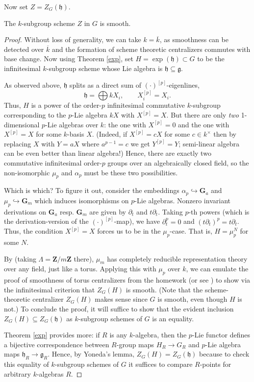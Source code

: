 \documentclass[10pt]{article}
\renewcommand{\(}{\left(}
\renewcommand{\)}{\right)}
\numberwithin{thm}{subsection}
\begin{document}
Now set $Z= Z_G(\mathfrak{h})$.
\begin{lemma}\label{smoothz}
The $k$-subgroup scheme $Z$ in $G$ is smooth.
\end{lemma}
\begin{proof}
Without loss of generality, we can take $k=\overline{k}$,
as smoothness can be detected over $\overline{k}$ and the formation
of scheme theoretic centralizers commutes with base change.
Now using Theorem \ref{exp}, set $H=\exp(\mathfrak{h})\subset G$ to be
the infinitesimal $k$-subgroup scheme whose Lie algebra is $\mathfrak{h} \subseteq \mathfrak{g}$.

As observed above, $\mathfrak{h}$ splits as a direct sum of $(\cdot)^{[p]}$-eigenlines,
\[\mathfrak{h}=\bigoplus kX_i,\qquad X_i^{[p]}= X_i.\]
Thus, $H$ is a power of the order-$p$ infinitesimal commutative $k$-subgroup
 corresponding to the $p$-Lie algebra $kX$ with 
$X^{[p]}=X$.  But there are only {\em two} 1-dimensional
$p$-Lie algebras over $k$: the one with $X^{[p]} = 0$ and
the one with $X^{[p]} = X$ for some $k$-basis $X$.
(Indeed, if $X^{[p]} = c X$ for some $c \in k^{\times}$ then 
by replacing $X$ with $Y = aX$ where $a^{p-1} = c$ we get $Y^{[p]} = Y$;
semi-linear algebra can be even better than linear algebra!)
Hence, there are exactly two commutative infinitesimal order-$p$ groups over an algebraically closed field,
so the non-isomorphic $\mu_p$ and $\alpha_p$ must be these two possibilities. 

Which is which? To figure it out, 
consider the embeddings
$\alpha_p\hookrightarrow\mathbf{G}_a$ and 
$\mu_p\hookrightarrow\mathbf{G}_m$ which induces isomorphisms on $p$-Lie algebras.
Nonzero invariant derivations 
on $\mathbf{G}_a$ resp. $\mathbf{G}_m$ are given by 
$\partial_t$ and $t \partial_t$.
Taking $p$-th powers
(which is the derivation-version of the $(\cdot)^{[p]}$-map),
we have 
$\partial_t^p = 0$ and 
$(t \partial_t)^p = t \partial_t$. 
Thus, the condition $X^{[p]}=X$ forces us to be
in the $\mu_p$-case.  That is, $H=\mu_p^N$ for some $N$.

By \cite[Lemma A.8.8]{pred} (taking $\Lambda = {\mathbf{Z}}/m{\mathbf{Z}}$ there), $\mu_m$ has completely reducible representation theory
over any field, just like a torus.  Applying this with $\mu_p$ over $k$, we can 
emulate the proof of smoothness of torus centralizers from the homework
(or see \cite[Prop.\,A.8.10(2)]{pred}) to show via the infinitesimal criterion that $Z_G(H)$ is smooth.
(Note that the scheme-theoretic 
centralizer $Z_G(H)$ makes sense since $G$ is smooth, even though $H$ is not.)
To conclude the proof, it will suffice to show that the evident inclusion
$Z_G(H) \subseteq Z_G(\mathfrak{h})$ as $k$-subgroup schemes of $G$ is an equality.

Theorem \ref{exp} provides more:
if $R$ is any $k$-algebra, then the $p$-Lie functor defines a 
bijective correspondence between $R$-group maps
$H_R \rightarrow G_R$ and $p$-Lie algebra maps
$\mathfrak{h}_R \rightarrow \mathfrak{g}_R$.  Hence, by Yoneda's lemma,
$Z_G(H)=Z_G(\mathfrak{h})$ 
because to check this equality of $k$-subgroup schemes of $G$ 
it suffices to compare $R$-points
for arbitrary $k$-algebras $R$. 
\end{proof}
\end{document}
